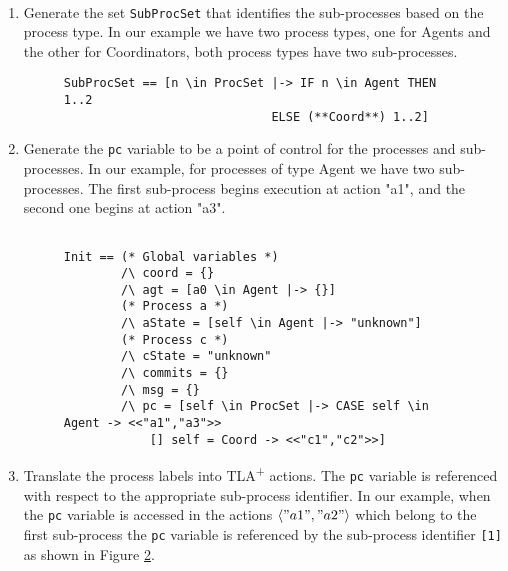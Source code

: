 \documentclass[journal]{IEEEtran}
\newcommand{\tlaplus}{TLA\textsuperscript{+}\xspace}
\newcommand{\seq}[1]{\langle #1 \rangle}
\begin{document}
\hfill\\
\begin{enumerate}

\item Generate the set \verb|SubProcSet| that identifies the sub-processes based on the process type.
In our example we have two process types, one for Agents and the other for Coordinators, both process types have two sub-processes.

\FloatBarrier
\begin{figure}[h!]
\label{2pcSubTla}
\begin{lstlisting}[frame = tlrb, numbers=none]
SubProcSet == [n \in ProcSet |-> IF n \in Agent THEN 1..2
                             ELSE (**Coord**) 1..2]

\end{lstlisting}
\end{figure}
\FloatBarrier

\item Generate the \verb|pc| variable to be a point of control for the processes and sub-processes.
In our example, for processes of type Agent we have two sub-processes. The first sub-process begins execution at action "a1", and the second one begins at action "a3".
\hfill\\

\FloatBarrier
\begin{figure}[!h]
\begin{lstlisting}[frame = tlrb, numbers=none]

Init == (* Global variables *)
        /\ coord = {}
        /\ agt = [a0 \in Agent |-> {}]
        (* Process a *)
        /\ aState = [self \in Agent |-> "unknown"]
        (* Process c *)
        /\ cState = "unknown"
        /\ commits = {}
        /\ msg = {}
        /\ pc = [self \in ProcSet |-> CASE self \in Agent -> <<"a1","a3">>
            [] self = Coord -> <<"c1","c2">>]
\end{lstlisting}
\end{figure}
\FloatBarrier

\item Translate the process labels into \tlaplus actions. The \verb|pc| variable is referenced with respect to the appropriate sub-process identifier.
In our example, when the \verb|pc| variable is accessed in the actions $\seq{"a1", "a2"}$ which belong to the first sub-process the \verb|pc| variable is referenced by the sub-process identifier \verb|[1]| as shown in Figure \ref{2pcSubProcPc}.

\FloatBarrier
\begin{figure}[!h]
\label{2pcSubProcPc}
\begin{lstlisting}[frame = tlrb, numbers=none]


\end{lstlisting}
\end{figure}
\end{enumerate}
\end{document}
